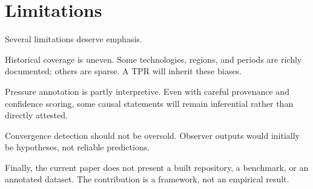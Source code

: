 \section{Limitations}

Several limitations deserve emphasis.

Historical coverage is uneven. Some technologies, regions, and periods are richly documented; others are sparse. A TPR will inherit these biases.

Pressure annotation is partly interpretive. Even with careful provenance and confidence scoring, some causal statements will remain inferential rather than directly attested.

Convergence detection should not be oversold. Observer outputs would initially be hypotheses, not reliable predictions.

Finally, the current paper does not present a built repository, a benchmark, or an annotated dataset. The contribution is a framework, not an empirical result.
